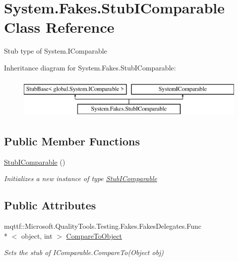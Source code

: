 \hypertarget{class_system_1_1_fakes_1_1_stub_i_comparable}{\section{System.\-Fakes.\-Stub\-I\-Comparable Class Reference}
\label{class_system_1_1_fakes_1_1_stub_i_comparable}
}


Stub type of System.\-I\-Comparable 


Inheritance diagram for System.\-Fakes.\-Stub\-I\-Comparable\-:\begin{figure}[H]
\begin{center}
\leavevmode
\includegraphics[height=2.000000cm]{class_system_1_1_fakes_1_1_stub_i_comparable}
\end{center}
\end{figure}
\subsection*{Public Member Functions}
\begin{DoxyCompactItemize}
\item 
\hyperlink{class_system_1_1_fakes_1_1_stub_i_comparable_abb100fe4299eeec16d19ea7dc3551985}{Stub\-I\-Comparable} ()
\begin{DoxyCompactList}\small\item\em Initializes a new instance of type \hyperlink{class_system_1_1_fakes_1_1_stub_i_comparable}{Stub\-I\-Comparable}\end{DoxyCompactList}\end{DoxyCompactItemize}
\subsection*{Public Attributes}
\begin{DoxyCompactItemize}
\item 
mqttf\-::\-Microsoft.\-Quality\-Tools.\-Testing.\-Fakes.\-Fakes\-Delegates.\-Func\\*
$<$ object, int $>$ \hyperlink{class_system_1_1_fakes_1_1_stub_i_comparable_a03154394a3bbba61c39e87b2ad2a1aa8}{Compare\-To\-Object}
\begin{DoxyCompactList}\small\item\em Sets the stub of I\-Comparable.\-Compare\-To(\-Object obj)\end{DoxyCompactList}\end{DoxyCompactItemize}



